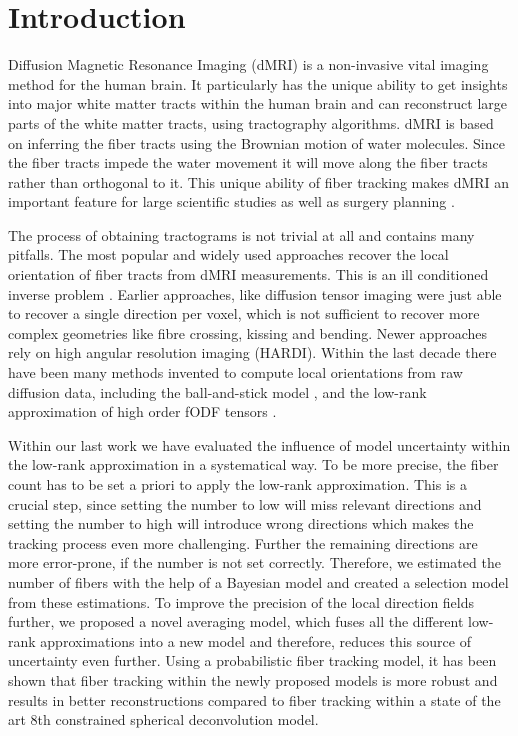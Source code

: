 \section{Introduction}
Diffusion Magnetic Resonance Imaging (dMRI) \cite{LeBihan:1986} is a
non-invasive vital imaging method for the human brain. It particularly has the
unique ability to get insights into major white matter tracts within the human
brain and can
reconstruct large parts of the white matter tracts, using tractography algorithms. dMRI is based on
inferring the fiber tracts using the Brownian motion of water molecules. Since
the fiber tracts impede the water movement it will move along the fiber tracts
rather than orthogonal to it. 
This unique ability of fiber tracking makes dMRI an important feature for large
scientific studies \cite{Sotiropoulos:2013, Tobisch:2018Frontiers} as well as surgery planning \cite{Yang:2021}.

The process of obtaining tractograms is not trivial at all and contains many
pitfalls. The most popular and widely used approaches recover the local
orientation of fiber tracts from dMRI measurements. This is an ill
conditioned inverse problem \cite{TOURNIER20071459}. Earlier approaches, like
diffusion tensor imaging \cite{BASSER1994247}
were just able to recover a single direction per voxel, which is not sufficient
to recover more complex geometries like fibre crossing, kissing and bending.
Newer approaches rely on high angular resolution imaging (HARDI). Within the
last decade there have been many methods invented to compute local orientations
from raw diffusion data, including the
ball-and-stick model \cite{BEHRENS2007144}, and the low-rank approximation of high order fODF tensors
\cite{lowrank, Ankele:CARS2017}.

Within our last work we have evaluated the influence of model uncertainty within
the low-rank approximation in a systematical way. To be more precise, the fiber
count has to be set a priori to apply the low-rank approximation. This is a
crucial step, since setting the number to low will miss relevant directions and
setting the number to high will introduce wrong directions which makes the
tracking process even more challenging. Further the remaining directions are
more error-prone, if the number is not set correctly. 
Therefore, we estimated the number of fibers with the help of a Bayesian model and
created a selection model from these estimations. To improve the precision of
the local direction fields
further, we proposed a novel averaging model, which fuses all the different
low-rank approximations into a new model and therefore, reduces this source of
uncertainty even further.
Using a probabilistic fiber tracking model, it has been shown that fiber
tracking within the newly proposed models is more robust and results in
better reconstructions compared to fiber tracking within a state of the art
 $8$th constrained spherical deconvolution model.

